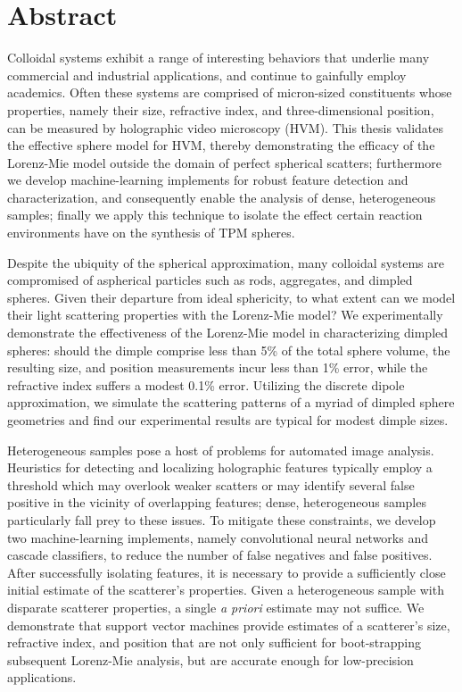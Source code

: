 \chapter*{Abstract}
\label{ch:abstract}


Colloidal systems exhibit a range of interesting behaviors that
underlie many commercial and industrial applications, and continue
to gainfully employ academics. Often these systems are comprised of
micron-sized constituents whose properties, namely their
size, refractive index, and three-dimensional position, can be measured
by holographic video microscopy (HVM). This thesis validates the effective
sphere model for HVM, thereby demonstrating the efficacy of the
Lorenz-Mie model outside the domain of perfect spherical scatters;
furthermore we develop machine-learning implements for robust feature
detection and characterization, and consequently enable the analysis of
dense, heterogeneous samples; finally we apply this technique to
isolate the effect certain reaction environments have on the
synthesis of TPM spheres.

Despite the ubiquity of the spherical approximation, many colloidal
systems are compromised of aspherical particles such as rods,
aggregates, and dimpled spheres.
Given their departure from
ideal sphericity, to what extent can we model their light scattering
properties with the Lorenz-Mie model?
We experimentally demonstrate the effectiveness of the Lorenz-Mie model
in characterizing dimpled spheres:
should the dimple comprise less than \num{5}\% of the total sphere volume,
the resulting size, and position measurements incur
less than \num{1}\% error, while the refractive index suffers a modest \num{0.1}\%
error. Utilizing the discrete dipole
approximation, we simulate the scattering patterns of a myriad of
dimpled sphere geometries and find our experimental results are
typical for modest dimple sizes.

Heterogeneous samples pose a host of problems for automated
image analysis. Heuristics for detecting and localizing holographic
features typically employ a threshold which may overlook weaker
scatters or may identify several false positive in the vicinity of
overlapping features; dense, heterogeneous samples
particularly fall prey to these issues. To mitigate these constraints, we
develop two machine-learning implements, namely convolutional
neural networks and cascade classifiers, to reduce the number of
false negatives and false positives. After successfully isolating
features, it is necessary to provide a sufficiently close initial
estimate of the scatterer's properties. Given a heterogeneous sample
with disparate scatterer properties, a single {\it a priori}
estimate may not suffice. We demonstrate that support vector machines
provide estimates of a scatterer's size, refractive index, and
position that are not only sufficient for boot-strapping subsequent
Lorenz-Mie analysis, but are accurate enough for low-precision
applications.

